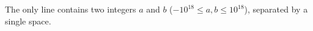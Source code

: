The only line contains two integers $a$ and $b$ ($-10^{18} \le a,b \le 10^{18}$), separated by a single space.

